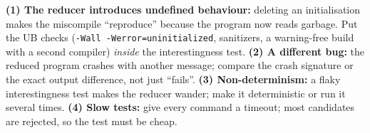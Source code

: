 \documentclass[10pt,a4paper,openany,oneside]{report}
\begin{document}
\begin{trapbox}
\textbf{(1) The reducer introduces undefined behaviour:} deleting an initialisation makes the miscompile ``reproduce'' because the program now reads garbage. Put the UB checks (\texttt{-Wall -Werror=uninitialized}, sanitizers, a warning-free build with a second compiler) \emph{inside} the interestingness test. \textbf{(2) A different bug:} the reduced program crashes with another message; compare the crash signature or the exact output difference, not just ``fails''. \textbf{(3) Non-determinism:} a flaky interestingness test makes the reducer wander; make it deterministic or run it several times. \textbf{(4) Slow tests:} give every command a timeout; most candidates are rejected, so the test must be cheap.
\end{trapbox}
\end{document}
